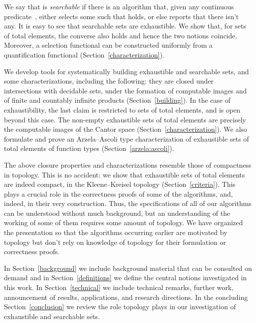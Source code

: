 \documentclass{LMCS}
\begin{document}
We say that  is \emph{searchable} if there is an algorithm that,
given any continuous predicate~, either selects some  such
that  holds, or else reports that there isn't any. It is easy to
see that searchable sets are exhaustible. We show that, for sets of
total elements, the converse also holds and hence the two notions
coincide.  Moreover, a selection functional can be constructed
uniformly from a quantification functional
(Section~\ref{characterization}).

We develop tools for systematically building exhaustible and
searchable sets, and some characterizations, including the following:
they are closed under intersections with decidable sets, under the
formation of computable images and of finite and countably infinite
products (Section~\ref{building}).  In the case of exhaustibility, the
last claim is restricted to sets of total elements, and is open beyond
this case.  The non-empty exhaustible sets of total elements are
precisely the computable images of the Cantor space (Section~\ref{characterization}). We also formulate and
prove an Arzela--Ascoli type characterization of exhaustible sets of
total elements of function types (Section~\ref{arzela:ascoli}).

The above closure properties and characterizations resemble those of
compactness in topology. This is no accident: we show that exhaustible
sets of total elements are indeed compact, in the Kleene--Kreisel
topology (Section~\ref{criteria}).  This plays a crucial role in the
correctness proofs of some of the algorithms, and, indeed, in their
very construction.  Thus, the specifications of all of our algorithms
can be understood without much background, but an understanding of the
working of some of them requires some amount of topology.  We have
organized the presentation so that the algorithms occurring earlier
are motivated by topology but don't rely on knowledge of topology for
their formulation or correctness proofs.

In Section~\ref{background} we include background material that can be
consulted on demand and in Section~\ref{definitions} we define the
central notions investigated in this work. In Section~\ref{technical}
we include technical remarks, further work, announcement of results,
applications, and research directions.  In the concluding
Section~\ref{conclusion} we review the role topology plays in our
investigation of exhaustible and searchable sets.
\end{document}
